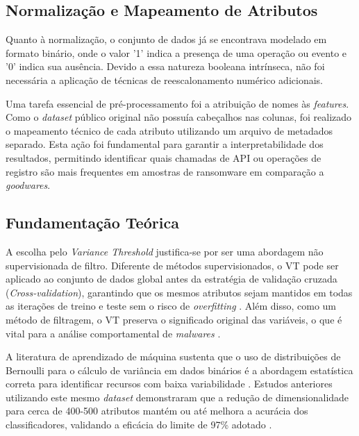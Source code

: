 \subsection{Normalização e Mapeamento de Atributos} \label{subsec:normalizacao}

Quanto à normalização, o conjunto de dados já se encontrava modelado em formato binário, onde o valor '1' indica a presença de uma operação ou evento e '0' indica sua ausência. Devido a essa natureza booleana intrínseca, não foi necessária a aplicação de técnicas de reescalonamento numérico adicionais.

Uma tarefa essencial de pré-processamento foi a atribuição de nomes às \textit{features}. Como o \textit{dataset} público original não possuía cabeçalhos nas colunas, foi realizado o mapeamento técnico de cada atributo utilizando um arquivo de metadados separado. Esta ação foi fundamental para garantir a interpretabilidade dos resultados, permitindo identificar quais chamadas de API ou operações de registro são mais frequentes em amostras de ransomware em comparação a \textit{goodwares}.

\subsection{Fundamentação Teórica} \label{subsec:fundamentacao}

A escolha pelo \textit{Variance Threshold} justifica-se por ser uma abordagem não supervisionada de filtro. Diferente de métodos supervisionados, o VT pode ser aplicado ao conjunto de dados global antes da estratégia de validação cruzada (\textit{Cross-validation}), garantindo que os mesmos atributos sejam mantidos em todas as iterações de treino e teste sem o risco de \textit{overfitting} \cite{james2013introduction}. Além disso, como um método de filtragem, o VT preserva o significado original das variáveis, o que é vital para a análise comportamental de \textit{malwares} \cite{scikit-learn}. 

A literatura de aprendizado de máquina sustenta que o uso de distribuições de Bernoulli para o cálculo de variância em dados binários é a abordagem estatística correta para identificar recursos com baixa variabilidade \cite{hastie2009elements}. Estudos anteriores utilizando este mesmo \textit{dataset} demonstraram que a redução de dimensionalidade para cerca de 400-500 atributos mantém ou até melhora a acurácia dos classificadores, validando a eficácia do limite de 97\% adotado \cite{sgandurra2016, caio2022}.